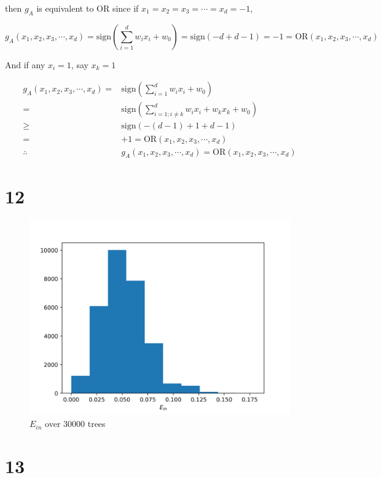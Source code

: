 \documentclass[fleqn,a4paper,12pt]{article}
\begin{document}
then $g_A$ is equivalent to OR since if $x_1 = x_2 = x_3 = \cdots = x_d = -1$,

\begin{equation*}
  g_A(x_1, x_2, x_3, \cdots, x_d) = \mathrm{sign}(\sum_{i=1}^d w_i x_i + w_0) = \mathrm{sign}(-d + d - 1) = -1 = \mathrm{OR}(x_1, x_2, x_3, \cdots, x_d)
\end{equation*}

And if any $x_i = 1$, say $x_k = 1$

\begin{align*}
  g_A(x_1, x_2, x_3, \cdots, x_d)
  =& \mathrm{sign}(\sum_{i=1}^d w_i x_i + w_0) \\
  =& \mathrm{sign}(\sum_{i=1; i \ne k}^d w_i x_i + w_k x_k + w_0) \\
  \geq& \mathrm{sign}(-(d - 1) + 1 + d - 1) \\
  =& +1 = \mathrm{OR}(x_1, x_2, x_3, \cdots, x_d) \\
  \therefore& g_A(x_1, x_2, x_3, \cdots, x_d) = \mathrm{OR}(x_1, x_2, x_3, \cdots, x_d)
\end{align*}


\section*{12}

\begin{figure}[H]
\centering
\includegraphics[width=0.75\linewidth]{hist-ein.png}
\caption{$E_{in}$ over 30000 trees}
\label{fig:hist-ein}
\end{figure}

\section*{13}
\end{document}
